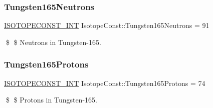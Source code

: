 \subsubsection{\texorpdfstring{Tungsten165\+Neutrons}{Tungsten165Neutrons}}
{\footnotesize\ttfamily \mbox{\hyperlink{group___isotope_const-_macros_ga5f18360b3e99483a35c32d789e62621c}{I\+S\+O\+T\+O\+P\+E\+C\+O\+N\+S\+T\+\_\+\+I\+NT}} Isotope\+Const\+::\+Tungsten165\+Neutrons = 91}

\$ \$ Neutrons in Tungsten-\/165. \mbox{\label{group___isotope_const-_tungsten-_w165_ga19b89b5fe0e40f62ae4534e45ea8808a}} 
\subsubsection{\texorpdfstring{Tungsten165\+Protons}{Tungsten165Protons}}
{\footnotesize\ttfamily \mbox{\hyperlink{group___isotope_const-_macros_ga5f18360b3e99483a35c32d789e62621c}{I\+S\+O\+T\+O\+P\+E\+C\+O\+N\+S\+T\+\_\+\+I\+NT}} Isotope\+Const\+::\+Tungsten165\+Protons = 74}

\$ \$ Protons in Tungsten-\/165. 